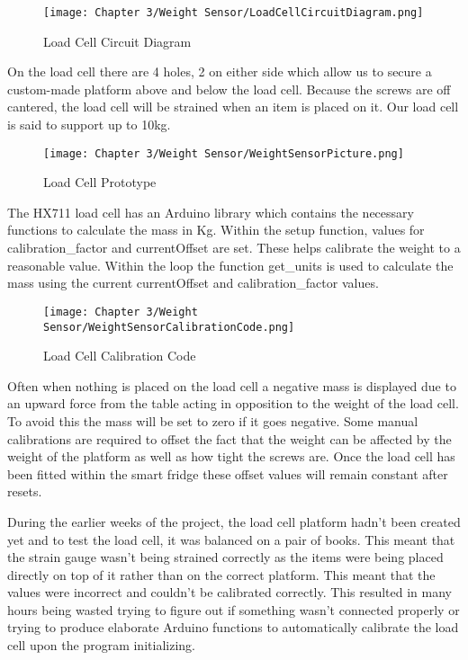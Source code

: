 \begin{figure}[H]        
    \centering
    \texttt{[image: Chapter 3/Weight Sensor/LoadCellCircuitDiagram.png]}
    \caption{Load Cell Circuit Diagram}
    \label{fig:lccircuit}
\end{figure} 

On the load cell there are 4 holes, 2 on either side which allow us to secure a custom-made platform above and below the load cell.
Because the screws are off cantered, the load cell will be strained when an item is placed on it.
Our load cell is said to support up to 10kg.

\begin{figure}[H]        
    \centering
    \texttt{[image: Chapter 3/Weight Sensor/WeightSensorPicture.png]}
    \caption{Load Cell Prototype}
    \label{fig:lcproto}
\end{figure} 

The HX711 load cell has an Arduino library which contains the necessary functions to calculate the mass in Kg.
Within the setup function, values for calibration\_factor and currentOffset are set.
These helps calibrate the weight to a reasonable value.
Within the loop the function get\_units is used to calculate the mass using the current currentOffset and calibration\_factor values.

\begin{figure}[H]        
    \centering
    \texttt{[image: Chapter 3/Weight Sensor/WeightSensorCalibrationCode.png]}
    \caption{Load Cell Calibration Code}
    \label{fig:lccode}
\end{figure} 

Often when nothing is placed on the load cell a negative mass is displayed due to an upward force from the table acting in opposition to the weight of the load cell.
To avoid this the mass will be set to zero if it goes negative.
Some manual calibrations are required to offset the fact that the weight can be affected by the weight of the platform as well as how tight the screws are.
Once the load cell has been fitted within the smart fridge these offset values will remain constant after resets.

During the earlier weeks of the project, the load cell platform hadn't been created yet and to test the load cell, it was balanced on a pair of books.
This meant that the strain gauge wasn't being strained correctly as the items were being placed directly on top of it rather than on the correct platform.
This meant that the values were incorrect and couldn't be calibrated correctly.
This resulted in many hours being wasted trying to figure out if something wasn't connected properly or trying to produce elaborate Arduino functions to automatically calibrate the load cell upon the program initializing.

